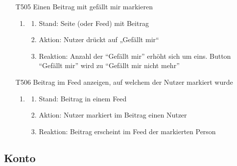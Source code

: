 \documentclass[parskip=full]{scrartcl}
\begin{document}
\begin{itemize}
		
		\item[T505]  Einen Beitrag mit gefällt mir markieren
		\begin{enumerate}
			\item
			\begin{enumerate}[nosep]	
				\item Stand: Seite (oder \gls{Feed}) mit Beitrag
				\item Aktion: Nutzer drückt auf „Gefällt mir“
				\item Reaktion: Anzahl der “Gefällt mir” erhöht sich um eins. \gls{Button} “Gefällt mir” wird zu “Gefällt mir nicht mehr”
			\end{enumerate} 
		\end{enumerate}
		
		
		\item[T506] Beitrag im \gls{Feed} anzeigen, auf welchem der Nutzer markiert wurde
		\begin{enumerate}
			\item
			\begin{enumerate}[nosep]	
				\item Stand:  Beitrag in einem \gls{Feed}
				\item Aktion: Nutzer markiert im Beitrag einen Nutzer
				\item Reaktion: Beitrag erscheint im \gls{Feed} der markierten Person
			\end{enumerate} 
		\end{enumerate} 
	\end{itemize}
	
	
	\subsection{Konto}
	
\end{document}
